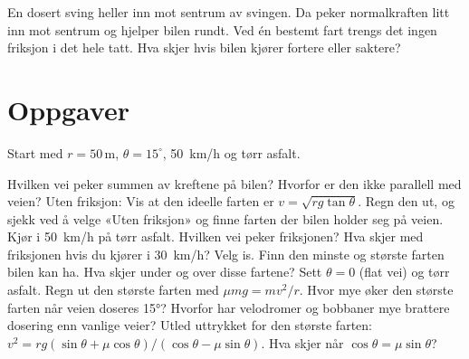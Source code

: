 \documentclass[11pt]{article}
\begin{document}

En dosert sving heller inn mot sentrum av svingen. Da peker normalkraften litt inn mot sentrum og hjelper bilen rundt. Ved én bestemt fart trengs det ingen friksjon i det hele tatt. Hva skjer hvis bilen kjører fortere eller saktere?

\section*{Oppgaver}

Start med $r = 50\,\mathrm{m}$, $θ = 15^{\circ}$, 50~km/h og tørr asfalt.

\begin{oppgaveliste}
\oppgave {}Hvilken vei peker summen av kreftene på bilen? Hvorfor er den ikke parallell med veien?
\svar
\oppgave {}Uten friksjon: Vis at den ideelle farten er $v = \sqrt{rg \tan  θ}$. Regn den ut, og sjekk ved å velge «Uten friksjon» og finne farten der bilen holder seg på veien.
\svar
\oppgave {}Kjør i 50~km/h på tørr asfalt. Hvilken vei peker friksjonen? Hva skjer med friksjonen hvis du kjører i 30~km/h?
\svar
\oppgave {}Velg is. Finn den minste og største farten bilen kan ha. Hva skjer under og over disse fartene?
\svar
\oppgave {}Sett $θ = 0$ (flat vei) og tørr asfalt. Regn ut den største farten med $μmg = mv^{2}/r$. Hvor mye øker den største farten når veien doseres 15°?
\svar
\oppgave {}Hvorfor har velodromer og bobbaner mye brattere dosering enn vanlige veier?
\svar
\oppgave {}Utled uttrykket for den største farten: $v^{2} = rg (\sin  θ + μ \cos  θ) / (\cos  θ - μ \sin  θ)$. Hva skjer når $\cos  θ = μ \sin  θ$?
\svar
\end{oppgaveliste}
\end{document}
